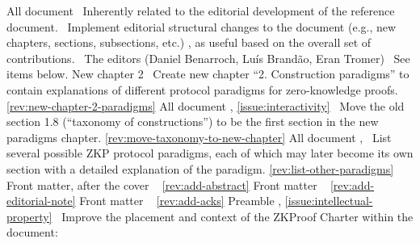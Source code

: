 All document
\newcol \ccontext\ Inherently related to the editorial development of the reference document. 
				\propContrib\ Implement editorial structural changes to the document (e.g., new chapters, 
				sections, subsections, etc.) , as useful based on the overall set of contributions.
\newcol {}
\newcol \contributors\ The editors (Daniel Benarroch, Luís Brandão, Eran Tromer)
				\Chan\ See items below.
\newcol 
\rowendL
New chapter 2
\newcol 
\newcol {}
\newcol \Chan\ Create new chapter ``2. Construction paradigms'' to contain explanations 
	of different protocol paradigms for zero-knowledge proofs. 
\newcol \ref{rev:new-chapter-2-paradigms}
\rowendL
All document
\newcol 
\newcol {}, \ref{issue:interactivity}
\newcol \Chan\ Move the old section 1.8 (``taxonomy of constructions'') 
	to be the first section in the new paradigms chapter.
\newcol \ref{rev:move-taxonomy-to-new-chapter}
\rowendL
All document
\newcol 
\newcol {}, 
\newcol \Chan\ List several possible ZKP protocol paradigms, each of which may later 
	become its own section with a detailed explanation of the paradigm.
\newcol \ref{rev:list-other-paradigms}
\rowendL
Front matter, after the cover
\newcol 
\newcol {}
\newcol \Chan\ 
\newcol \ref{rev:add-abstract}
\rowendL
Front matter
\newcol 
\newcol {}
\newcol \Chan\ 
\newcol \ref{rev:add-editorial-note}
\rowendL
Front matter
\newcol 
\newcol {}
\newcol \Chan\ 
\newcol \ref{rev:add-acks}
\rowendL
Preamble
\newcol 
\newcol {}, \ref{issue:intellectual-property}
\newcol \Chan\ Improve the placement and context of the ZKProof Charter within the document:
